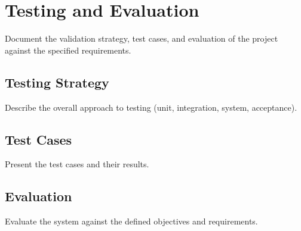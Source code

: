 \chapter{Testing and Evaluation}
\label{chap:testing}

Document the validation strategy, test cases, and evaluation
of the project against the specified requirements.

\section{Testing Strategy}
\label{sec:testingstrategy}

Describe the overall approach to testing (unit, integration,
system, acceptance).

\section{Test Cases}
\label{sec:testcases}

Present the test cases and their results.

\section{Evaluation}
\label{sec:evaluation}

Evaluate the system against the defined objectives and
requirements.
